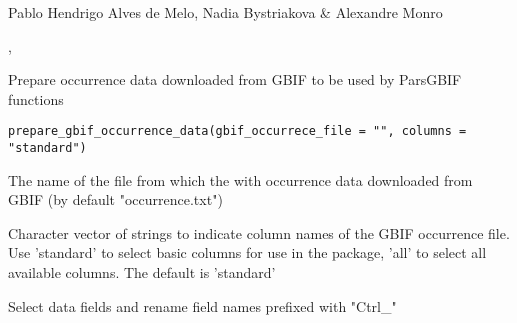 \documentclass[a4paper]{book}
\begin{document}
%
\begin{Author}
Pablo Hendrigo Alves de Melo,
Nadia Bystriakova \&
Alexandre Monro
\end{Author}
%
\begin{SeeAlso}
, 
\end{SeeAlso}
%
\begin{Examples}
\end{Examples}
%
\begin{Description}
Prepare occurrence data downloaded from GBIF to be used by ParsGBIF functions
\end{Description}
%
\begin{Usage}
\begin{verbatim}
prepare_gbif_occurrence_data(gbif_occurrece_file = "", columns = "standard")
\end{verbatim}
\end{Usage}
%
\begin{Arguments}
\begin{ldescription}
\item[\code{gbif\_occurrece\_file}] The name of the file from which the with occurrence data
downloaded from GBIF (by default "occurrence.txt")

\item[\code{columns}] Character vector of strings to indicate column names of the GBIF occurrence file.
Use 'standard' to select basic columns for use in the package, 'all' to select all available columns.
The default is 'standard'
\end{ldescription}
\end{Arguments}
%
\begin{Details}
Select data fields and rename field names prefixed with "Ctrl\_"
\end{Details}
\end{document}
